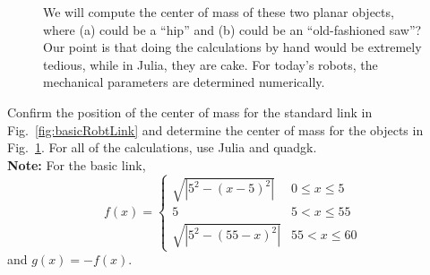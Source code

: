  \begin{figure}[htb]%
\centering
{}%
\hfill%
%

    \caption[]{We will compute the center of mass of these two planar objects, where (a) could be a ``hip'' and (b) could be an ``old-fashioned saw''? Our point is that doing the calculations by hand would be extremely tedious, while in Julia, they are cake. For today's robots, the mechanical parameters are determined numerically.}
    \label{fig:CustomLinks}
\end{figure}

\bigskip

\begin{example} Confirm the position of the center of mass for the standard link in Fig.~\ref{fig:basicRobtLink} and determine the center of mass for the objects in Fig.~\ref{fig:CustomLinks}. For all of the calculations, use Julia and quadgk.    \\

\textbf{Note:} For the basic link, $$f(x) = \begin{cases}
    \sqrt{|5^2 - (x-5)^2|} & 0 \le x \le 5 \\[1em]
    5 & 5 < x \le 55 \\[1em]
     \sqrt{|5^2 - (55 - x)^2|} & 55< x \le 60
\end{cases} $$
and $g(x) = -f(x)$.
\end{example}


